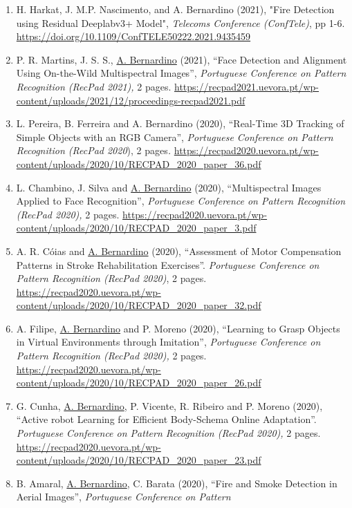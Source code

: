 \documentclass[
]{article}
\begin{document}
\begin{enumerate}
\def\labelenumi{\arabic{enumi}.}
\item
  H. Harkat, J. M.P. Nascimento, and A. Bernardino (2021), "Fire
  Detection using Residual Deeplabv3+ Model", \emph{Telecoms Conference
  (ConfTele)}, pp 1-6.
  \url{https://doi.org/10.1109/ConfTELE50222.2021.9435459}
\item
  P. R. Martins, J. S. S., \ul{A. Bernardino} (2021), ``Face Detection
  and Alignment Using On-the-Wild Multispectral Images'',
  \emph{Portuguese Conference on Pattern Recognition (RecPad 2021),} 2
  pages.
  \url{https://recpad2021.uevora.pt/wp-content/uploads/2021/12/proceedings-recpad2021.pdf}~
\item
  L. Pereira, B. Ferreira and A. Bernardino (2020), ``Real-Time 3D
  Tracking of Simple Objects with an RGB Camera'', \emph{Portuguese
  Conference on Pattern Recognition (RecPad 2020}), 2 pages\emph{.}
  \url{https://recpad2020.uevora.pt/wp-content/uploads/2020/10/RECPAD_2020_paper_36.pdf}
\item
  L. Chambino, J. Silva and \ul{A. Bernardino} (2020), ``Multispectral
  Images Applied to Face Recognition'', \emph{Portuguese Conference on
  Pattern Recognition (RecPad 2020),} 2 pages.
  \url{https://recpad2020.uevora.pt/wp-content/uploads/2020/10/RECPAD_2020_paper_3.pdf}~
\item
  A. R. Cóias and \ul{A. Bernardino} (2020), ``Assessment of Motor
  Compensation Patterns in Stroke Rehabilitation Exercises''.
  \emph{Portuguese Conference on Pattern Recognition (RecPad 2020)}, 2
  pages.
  \url{https://recpad2020.uevora.pt/wp-content/uploads/2020/10/RECPAD_2020_paper_32.pdf}~
\item
  A. Filipe, \ul{A. Bernardino} and P. Moreno (2020), ``Learning to
  Grasp Objects in Virtual Environments through Imitation'',
  \emph{Portuguese Conference on Pattern Recognition (RecPad 2020),} 2
  pages.
  \url{https://recpad2020.uevora.pt/wp-content/uploads/2020/10/RECPAD_2020_paper_26.pdf}~
\item
  G. Cunha, \ul{A. Bernardino}, P. Vicente, R. Ribeiro and P. Moreno
  (2020), ``Active robot Learning for Efficient Body-Schema Online
  Adaptation''. \emph{Portuguese Conference on Pattern Recognition
  (RecPad 2020),} 2 pages.
  \url{https://recpad2020.uevora.pt/wp-content/uploads/2020/10/RECPAD_2020_paper_23.pdf}~
\item
  B. Amaral, \ul{A. Bernardino}, C. Barata (2020), ``Fire and Smoke
  Detection in Aerial Images'', \emph{Portuguese Conference on Pattern
}
\end{enumerate}
\end{document}
